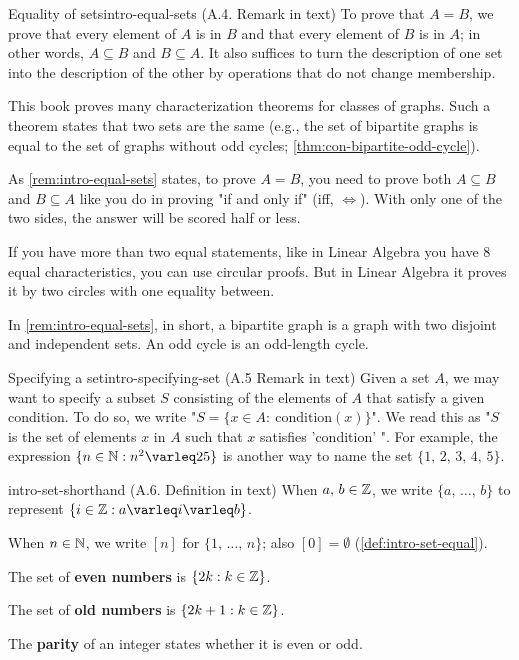\documentclass[../src/handouts/main.tex]{subfiles}
\begin{document}

\begin{remark}{Equality of sets}{intro-equal-sets}
  (A.4. Remark in text)
  To prove that $A = B$, we prove that every element of $A$ is in $B$ and that every element of $B$ is in $A$; in other words, $A \subseteq B$ and $B \subseteq A$. It also suffices to turn the description of one set into the description of the other by operations that do not change membership.

  This book proves many characterization theorems for classes of graphs. Such a theorem states that two sets are the same (e.g., the set of bipartite graphs is equal to the set of graphs without odd cycles; \cref{thm:con-bipartite-odd-cycle}).
\end{remark}

As \cref{rem:intro-equal-sets} states, to prove $A = B$, you need to prove both $A \subseteq B$ and $B \subseteq A$ like you do in proving "if and only if" (iff, $\iff$). With only one of the two sides, the answer will be scored half or less.

If you have more than two equal statements, like in Linear Algebra you have 8 equal characteristics, you can use circular proofs. But in Linear Algebra it proves it by two circles with one equality between.

In \cref{rem:intro-equal-sets}, in short, a bipartite graph is a graph with two disjoint and independent sets. An odd cycle is an odd-length cycle.

\begin{remark}{Specifying a set}{intro-specifying-set}
  (A.5 Remark in text)
  Given a set $A$, we may want to specify a subset $S$ consisting of the elements of $A$ that satisfy a given condition. To do so, we write "$S = \{ x \in A:\ \text{condition}(x)\}$". We read this as "$S$ is the set of elements $x$ in $A$ such that $x$ satisfies 'condition' ". For example, the expression $\{ n \in \N : n^2 \leq 25 \}$ is another way to name the set $\{ 1,\, 2,\, 3,\, 4,\, 5 \}$.
\end{remark}

\begin{definition}{}{intro-set-shorthand}
  (A.6. Definition in text)
  When $a,\, b \in \mathbb{Z}$, we write $\{a,\, \ldots,\, b\}$ to represent $\{ i \in \Z: a \leq i \leq b \}$.

  When $n \in \mathbb{N}$, we write $[n]$ for $\{1,\, \ldots,\, n\}$; also $[0] = \emptyset$ (\cref{def:intro-set-equal}).

  The set of \textbf{even numbers} is $\{ 2 k : k \in \mathbb{Z} \}$.

  The set of \textbf{old numbers} is $\{ 2 k + 1 : k \in \mathbb{Z} \}$.

  The \textbf{parity} of an integer states whether it is even or odd.
\end{definition}
\end{document}
